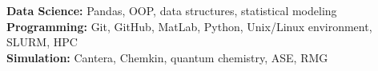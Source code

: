 \documentclass[10pt, line]{res}
\begin{document}
\begin{resume}
\textbf{Data Science:} Pandas, OOP, data structures, statistical modeling\\
\textbf{Programming:} Git, GitHub, MatLab, Python, Unix/Linux environment, SLURM, HPC\\
\textbf{Simulation:} Cantera, Chemkin, quantum chemistry, ASE, RMG







 
\end{resume} 
\end{document}
